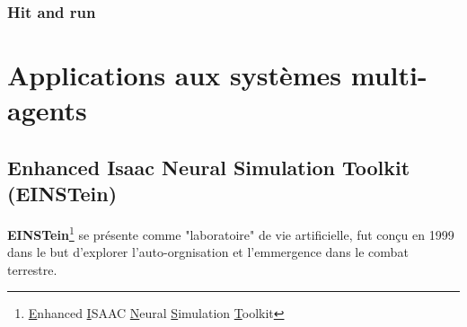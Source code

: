 \documentclass{article}
\begin{document}
\subsubsection{Hit and run}




\section{Applications aux systèmes multi-agents}

\subsection{Enhanced Isaac Neural Simulation Toolkit (EINSTein)}

\textbf{EINSTein}\footnote{\underline{E}nhanced \underline{I}SAAC \underline{N}eural \underline{S}imulation \underline{T}oolkit} se présente comme "laboratoire" de vie artificielle, fut conçu en 1999 dans le but d'explorer l'auto-orgnisation et l'emmergence dans le combat terrestre. 
\end{document}
